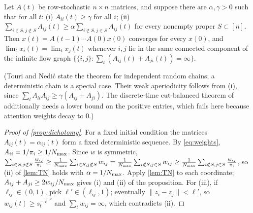 \begin{lemma}\label{lem:TN}
Let $A(t)$ be row-stochastic $n\times n$ matrices, and suppose there are $\alpha,\gamma>0$ such that for all $t$: (i) $A_{ii}(t)\ge\gamma$ for
all $i$; (ii) $\sum_{i\in S,j\notin S}A_{ij}(t)\ge\alpha\sum_{i\notin S,j\in S}A_{ij}(t)$ for every nonempty proper $S\subset[n]$. Then
$x(t)=A(t-1)\cdots A(0)x(0)$ converges for every $x(0)$, and $\lim_tx_i(t)=\lim_tx_j(t)$ whenever $i,j$ lie in the same connected component of the
infinite flow graph $\{\{i,j\}:\sum_t(A_{ij}(t)+A_{ji}(t))=\infty\}$.
\end{lemma}
(Touri and Nedi\'c state the theorem for independent random chains; a deterministic chain is a special case. Their weak aperiodicity follows
from (i), since $\sum_lA_{li}A_{lj}\ge\gamma(A_{ij}+A_{ji})$. The discrete-time cut-balanced theorem of \citet{hendrickx2013} additionally
needs a lower bound on the positive entries, which fails here because attention weights decay to $0$.)

\begin{proof}[Proof of \cref{prop:dichotomy}]
For a fixed initial condition the matrices $A_{ij}(t)=\alpha_{ij}(t)$ form a fixed deterministic sequence. By \eqref{eq:weights},
$A_{ii}=1/\pi_i\ge1/N_{\max}$. Since $w$ is symmetric,
$\sum_{i\in S,j\notin S}\frac{w_{ij}}{\pi_i}\ge\frac1{N_{\max}}\sum_{i\in S,j\notin S}w_{ij}=\frac1{N_{\max}}\sum_{i\notin S,j\in S}w_{ij}\ge
\frac1{N_{\max}}\sum_{i\notin S,j\in S}\frac{w_{ij}}{\pi_i}$, so (ii) of \cref{lem:TN} holds with $\alpha=1/N_{\max}$. Apply \cref{lem:TN} to each
coordinate; $A_{ij}+A_{ji}\ge2w_{ij}/N_{\max}$ gives (i) and (ii) of the proposition. For (iii), if $\ell_{ij}\in(0,1)$, pick $\ell'\in(\ell_{ij},1)$;
eventually $\|z_i-z_j\|<\ell'$, so $w_{ij}(t)\ge s_t^{-\ell'^2}$ and $\sum_tw_{ij}=\infty$, which contradicts (ii).
\end{proof}

